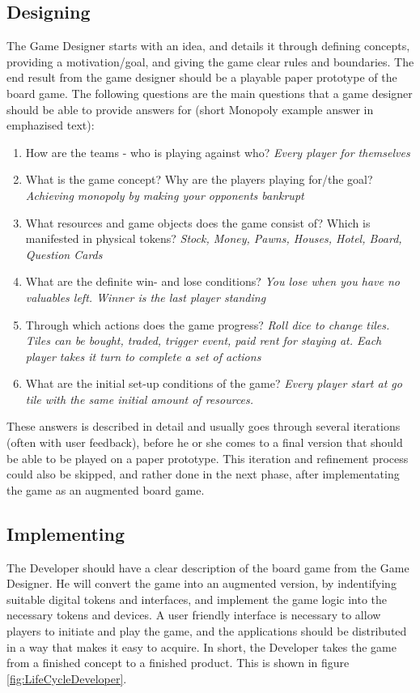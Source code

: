 \subsection{Designing}
The Game Designer starts with an idea, and details it through defining concepts, providing a motivation/goal, and giving the game clear rules and boundaries. The end result from the game designer should be a playable paper prototype of the board game. The following questions are the main questions that a game designer should be able to provide answers for (short Monopoly example answer in emphazised text):
\begin{enumerate} \label{design_cycle}
\item How are the teams - who is playing against who? \emph{Every player for themselves}
\item What is the game concept? Why are the players playing for/the goal? \emph{Achieving monopoly by making your opponents bankrupt}
\item What resources and game objects does the game consist of? Which is manifested in physical tokens? \emph{Stock, Money, Pawns, Houses, Hotel, Board, Question Cards}
\item What are the definite win- and lose conditions? \emph{You lose when you have no valuables left. Winner is the last player standing}
\item Through which actions does the game progress? \emph{Roll dice to change tiles. Tiles can be bought, traded, trigger event, paid rent for staying at. Each player takes it turn to complete a set of actions}
\item What are the initial set-up conditions of the game? \emph{Every player start at go tile with the same initial amount of resources.}
\end{enumerate}
These answers is described in detail and usually goes through several iterations (often with user feedback), before he or she comes to a final version that should be able to be played on a paper prototype. This iteration and refinement process could also be skipped, and rather done in the next phase, after implementating the game as an augmented board game.

\subsection{Implementing}
The Developer should have a clear description of the board game from the Game Designer. He will convert the game into an augmented version, by indentifying suitable digital tokens and interfaces, and implement the game logic into the necessary tokens and devices. A user friendly interface is necessary to allow players to initiate and play the game, and the applications should be distributed in a way that makes it easy to acquire. In short, the Developer takes the game from a finished concept to a finished product. This is shown in figure  \ref{fig:LifeCycleDeveloper}.

